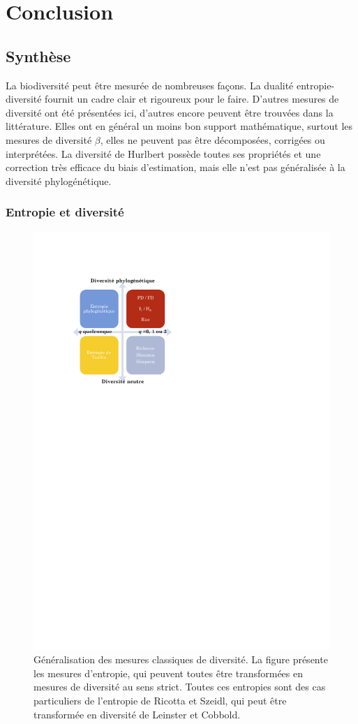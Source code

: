 \documentclass[
  11pt,
  french,
  a4paper,
  extrafontsizes,onecolumn,openright
  ]{memoir}
\begin{document}
\part{Conclusion}\label{part-conclusion}

\chapter{Synthèse}\label{sec-conclusionSynthese}

La biodiversité peut être mesurée de nombreuses façons.
La dualité entropie-diversité fournit un cadre clair et rigoureux pour le faire.
D'autres mesures de diversité ont été présentées ici, d'autres encore peuvent être trouvées dans la littérature.
Elles ont en général un moins bon support mathématique, surtout les mesures de diversité \(\beta\), elles ne peuvent pas être décomposées, corrigées ou interprétées.
La diversité de Hurlbert possède toutes ses propriétés et une correction très efficace du biais d'estimation, mais elle n'est pas généralisée à la diversité phylogénétique.

\section{Entropie et diversité}\label{entropie-et-diversituxe9-1}



\scriptsize

\begin{figure}

{\centering \includegraphics[width=0.6\linewidth]{images/ConclusionFig} 

}

\caption{Généralisation des mesures classiques de diversité. La figure présente les mesures d'entropie, qui peuvent toutes être transformées en mesures de diversité au sens strict. Toutes ces entropies sont des cas particuliers de l'entropie de Ricotta et Szeidl, qui peut être transformée en diversité de Leinster et Cobbold.}\label{fig:ConclusionFig}
\end{figure}
\end{document}
